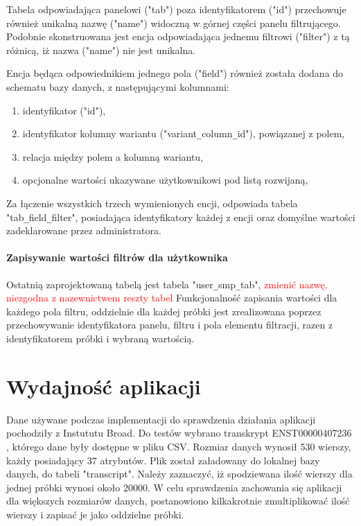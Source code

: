 \documentclass[a4paper,12pt,twoside]{article}
\begin{document}
Tabela odpowiadająca panelowi ("tab") poza identyfikatorem ("id") przechowuje również unikalną nazwę ("name") widoczną w górnej części panelu filtrującego. 
Podobnie skonstruowana jest encja odpowiadająca jednemu filtrowi ("filter") z tą różnicą, 
iż nazwa ("name") nie jest unikalna. 

Encja będąca odpowiednikiem jednego pola ("field") również została dodana do schematu bazy danych,
z następującymi kolumnami: 
\begin{enumerate}[1)]
\item identyfikator ("id"),
\item identyfikator kolumny wariantu ("variant\verb!_!column\verb!_!id"), powiązanej z polem,
\item relacja między polem a kolumną wariantu,
\item opcjonalne wartości ukazywane użytkownikowi pod listą rozwijaną,
\end{enumerate}

Za łączenie wszystkich trzech wymienionych encji, odpowiada tabela 
"tab\verb!_!field\verb!_!filter", posiadająca identyfikatory każdej z encji oraz
domyślne wartości zadeklarowane przez administratora.

\paragraph{Zapisywanie wartości filtrów dla użytkownika} 
Ostatnią zaprojektowaną tabelą jest tabela "user\verb!_!smp\verb!_!tab",
\textcolor{red}{
 zmienić nazwę, niezgodna z nazewnictwem reszty tabel
}
Funkcjonalność zapisania wartości dla każdego pola filtru, oddzielnie dla każdej próbki
jest zrealizowana poprzez przechowywanie identyfikatora panelu, filtru i pola elementu filtracji,
razen z identyfikatorem próbki i wybraną wartością. 

\newpage
\section{Wydajność aplikacji}  

Dane używane podczas implementacji do sprawdzenia działania aplikacji pochodziły
z Instututu Broad.
Do testów wybrano transkrypt ENST00000407236 \cite{testData},
którego dane były dostępne w pliku CSV. Rozmiar danych wynosił 530 wierszy, każdy posiadający 37 atrybutów. Plik został załadowany do lokalnej bazy danych, do tabeli 
"transcript". Należy zaznaczyć, iż spodziewana ilość wierszy dla jednej próbki wynosi około 20000.
 W celu sprawdzenia zachowania się aplikacji 
dla większych rozmiarów danych, postanowiono kilkakrotnie zmultiplikować
ilość wierszy i zapisać je jako oddzielne próbki.
\end{document}
